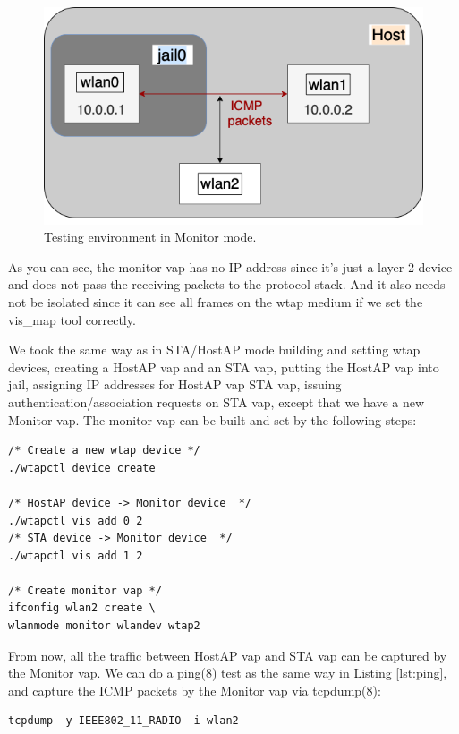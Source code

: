 \documentclass[conference]{IEEEtran}
\begin{document}
\begin{figure}[H]
\includegraphics[scale=0.40]{ping_monitor.png}
\caption{Testing environment in Monitor mode.}
\label{fig:monitor}
\end{figure}

As you can see, the monitor vap has no IP address since it's just a layer 2 device and does not pass the receiving packets to the protocol stack. And it also needs not be isolated since it can see all frames on the wtap medium if we set the vis\_map tool correctly.

We took the same way as in STA/HostAP mode building and setting wtap devices, creating a HostAP vap and an STA vap, putting the HostAP vap into jail, assigning IP addresses for HostAP vap STA vap, issuing authentication/association requests on STA vap, except that we have a new Monitor vap. The monitor vap can be built and set by the following steps:

\begin{lstlisting}
/* Create a new wtap device */
./wtapctl device create

/* HostAP device -> Monitor device  */
./wtapctl vis add 0 2
/* STA device -> Monitor device  */
./wtapctl vis add 1 2

/* Create monitor vap */
ifconfig wlan2 create \
wlanmode monitor wlandev wtap2
\end{lstlisting}

From now, all the traffic between HostAP vap and STA vap can be captured by the Monitor vap. We can do a ping(8) test as the same way in Listing \ref{lst:ping}, and capture the ICMP packets by the Monitor vap via tcpdump(8):

\begin{lstlisting}
tcpdump -y IEEE802_11_RADIO -i wlan2
\end{lstlisting}
\end{document}
